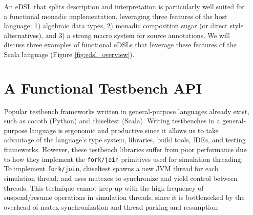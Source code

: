 \documentclass[sigplan,review,nonacm,9pt]{acmart}
\begin{document}
An eDSL that splits description and interpretation is particularly well suited for a functional monadic implementation, leveraging three features of the host language: 1) algebraic data types, 2) monadic composition sugar (or direct style alternatives\cite{dotty_cps_async, koka}), and 3) a strong macro system for source annotations.
We will discuss three examples of functional eDSLs that leverage these features of the Scala language (Figure \ref{fig:edsl_overview}).

\section{A Functional Testbench API}

Popular testbench frameworks written in general-purpose languages already exist, such as cocotb\cite{cocotb} (Python) and chiseltest\cite{chiseltest} (Scala).
Writing testbenches in a general-purpose language is ergonomic and productive since it allows us to take advantage of the language's type system, libraries, build tools, IDEs, and testing frameworks.
However, these testbench libraries suffer from poor performance due to how they implement the \texttt{fork/join} primitives used for simulation threading.
To implement \texttt{fork/join}, chiseltest spawns a new JVM thread for each simulation thread, and uses mutexes to synchronize and yield control between threads.
This technique cannot keep up with the high frequency of suspend/resume operations in simulation threads, since it is bottlenecked by the overhead of mutex synchronization and thread parking and resumption.

\end{document}
